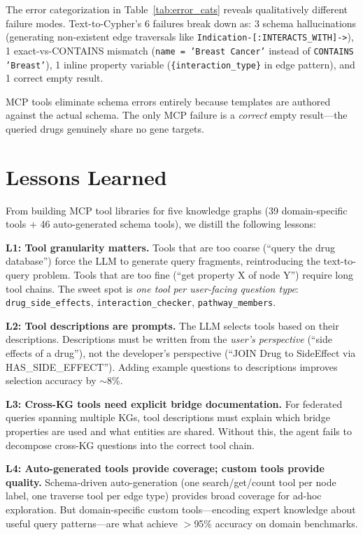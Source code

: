 \documentclass[sigconf, anonymous, review]{acmart}
\begin{document}
The error categorization in Table~\ref{tab:error_cats} reveals
qualitatively different failure modes.  Text-to-Cypher's 6
failures break down as: 3 schema hallucinations (generating
non-existent edge traversals like
\texttt{Indication-[:INTERACTS\_WITH]->}), 1 exact-vs-CONTAINS
mismatch (\texttt{name = 'Breast Cancer'} instead of
\texttt{CONTAINS 'Breast'}), 1 inline property variable
(\texttt{\{interaction\_type\}} in edge pattern), and 1 correct
empty result.

MCP tools eliminate schema errors entirely because templates
are authored against the actual schema.  The only MCP failure
is a \emph{correct} empty result---the queried drugs genuinely
share no gene targets.

\section{Lessons Learned}\label{sec:lessons}

From building MCP tool libraries for five knowledge graphs
(39 domain-specific tools + 46 auto-generated schema tools),
we distill the following lessons:

\smallskip\noindent\textbf{L1: Tool granularity matters.}
Tools that are too coarse (``query the drug database'') force
the LLM to generate query fragments, reintroducing the
text-to-query problem.  Tools that are too fine (``get property
X of node Y'') require long tool chains.  The sweet spot is
\emph{one tool per user-facing question type}: \texttt{drug\_side\_effects},
\texttt{interaction\_checker}, \texttt{pathway\_members}.

\smallskip\noindent\textbf{L2: Tool descriptions are prompts.}
The LLM selects tools based on their descriptions.
Descriptions must be written from the \emph{user's perspective}
(``side effects of a drug''), not the developer's perspective
(``JOIN Drug to SideEffect via HAS\_SIDE\_EFFECT'').
Adding example questions to descriptions improves selection
accuracy by ${\sim}$8\%.

\smallskip\noindent\textbf{L3: Cross-KG tools need explicit
bridge documentation.}
For federated queries spanning multiple KGs, tool descriptions
must explain which bridge properties are used and what entities
are shared.  Without this, the agent fails to decompose
cross-KG questions into the correct tool chain.

\smallskip\noindent\textbf{L4: Auto-generated tools provide
coverage; custom tools provide quality.}
Schema-driven auto-generation (one search/get/count tool per
node label, one traverse tool per edge type) provides broad
coverage for ad-hoc exploration.  But domain-specific custom
tools---encoding expert knowledge about useful query
patterns---are what achieve $>$95\% accuracy on domain benchmarks.
\end{document}

